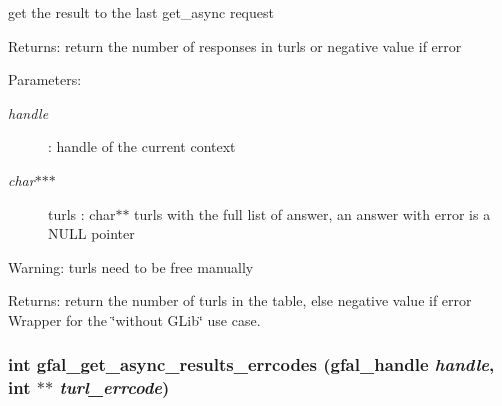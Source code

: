 get the result to the last get\_\-async request \begin{Desc}
\item[Returns:]return the number of responses in turls or negative value if error \end{Desc}
\begin{Desc}
\item[Parameters:]
\begin{description}
\item[{\em handle}]: handle of the current context \item[{\em char$\ast$$\ast$$\ast$}]turls : char$\ast$$\ast$ turls with the full list of answer, an answer with error is a NULL pointer \end{description}
\end{Desc}
\begin{Desc}
\item[Warning:]turls need to be free manually \end{Desc}
\begin{Desc}
\item[Returns:]return the number of turls in the table, else negative value if error Wrapper for the \char`\"{}without GLib\char`\"{} use case. \end{Desc}
\subsubsection{\setlength{\rightskip}{0pt plus 5cm}int gfal\_\-get\_\-async\_\-results\_\-errcodes (gfal\_\-handle {\em handle}, int $\ast$$\ast$ {\em turl\_\-errcode})}\label{gfal__common__interface_8c_2ea6b8dae8f2f76d5e83711fe6ce5510}


